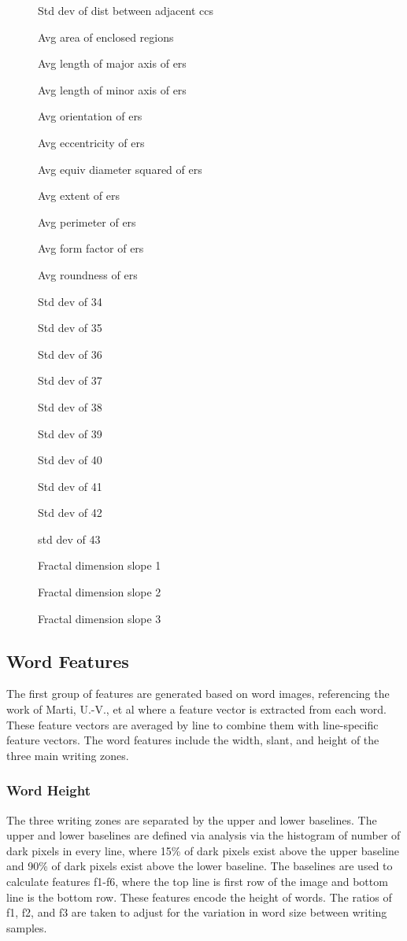 \documentclass[paper=a4, fontsize=11pt]{scrartcl} %
\numberwithin{equation}{section} %
\numberwithin{figure}{section} %
\numberwithin{table}{section} %
\begin{document}
\begin{figure}
\begin{multicols}{3}
\begin{enumerate*}
    \item Std dev of dist between adjacent ccs
    \item Avg area of enclosed regions
    \item Avg length of major axis of ers
    \item Avg length of minor axis of ers
    \item Avg orientation of ers
    \item Avg eccentricity of ers
    \item Avg equiv diameter squared of ers
    \item Avg extent of ers
    \item Avg perimeter of ers
    \item Avg form factor of ers
    \item Avg roundness of ers
    \item Std dev of 34
    \item Std dev of 35
    \item Std dev of 36
    \item Std dev of 37
    \item Std dev of 38
    \item Std dev of 39
    \item Std dev of 40
    \item Std dev of 41
    \item Std dev of 42
    \item std dev of 43
    \item Fractal dimension slope 1
    \item Fractal dimension slope 2
    \item Fractal dimension slope 3
    \end{enumerate*}
  \end{multicols}
\end{figure}

\subsection{Word Features}
The first group of features are generated based on word images,
referencing the work of Marti, U.-V., et al \cite{WriterID} where a
feature vector is extracted from each word. These feature vectors are
averaged by line to combine them with line-specific feature
vectors. The word features include the width, slant, and height of the
three main writing zones.

\subsubsection{Word Height}
The three writing zones are separated by the upper and lower
baselines. The upper and lower baselines are defined via analysis via
the histogram of number of dark pixels in every line, where 15\% of
dark pixels exist above the upper baseline and 90\% of dark pixels
exist above the lower baseline. The baselines are used to calculate
features f1-f6, where the top line is first row of the image and
bottom line is the bottom row. These features encode the height of
words. The ratios of f1, f2, and f3 are taken to adjust for the
variation in word size between writing samples.
\end{document}
